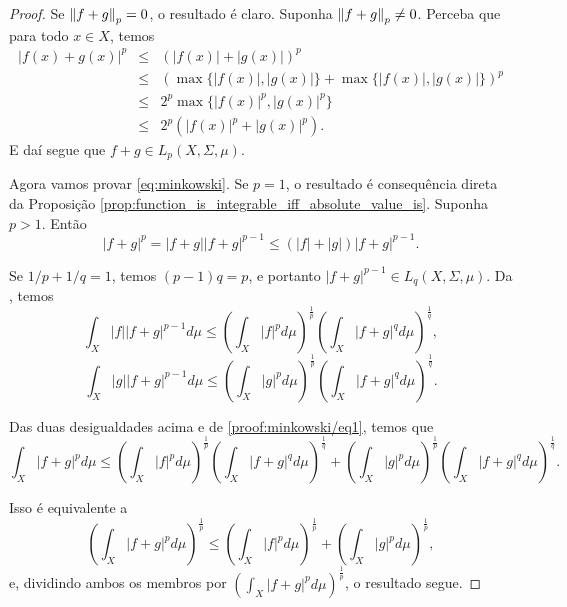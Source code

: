 \begin{proof}
    Se $\left\lVert f + g \right\rVert_p = 0$, o resultado é claro. Suponha $\left\lVert f + g \right\rVert_p \neq 0$. Perceba que para todo $x \in X$, temos
    \begin{eqnarray*}
        |f(x) + g(x)|^p
        &\leq& \left( |f(x)| + |g(x)| \right)^p\\
        &\leq& \left( \max\{|f(x)|, |g(x)|\} + \max\{|f(x)|, |g(x)|\} \right)^p \\
        &\leq& 2^p \max\{ |f(x)|^p, |g(x)|^p \} \\
       &\leq& 2^p \left( |f(x)|^p + |g(x)|^p \right).
    \end{eqnarray*}
    E daí segue que $f + g \in L_p(X, \Sigma, \mu)$.

    Agora vamos provar \eqref{eq:minkowski}. Se $p = 1$, o resultado é consequência direta da Proposição \ref{prop:function_is_integrable_iff_absolute_value_is}. Suponha $p > 1$. Então
    \begin{equation}\label{proof:minkowski/eq1}
        |f + g|^p = |f + g||f + g|^{p-1}
        \leq \left( |f| + |g| \right) |f + g|^{p-1}.
    \end{equation}

    Se $1/p + 1/q = 1$, temos $(p-1)q = p$, e portanto $|f + g|^{p-1} \in L_q(X, \Sigma, \mu)$. Da , temos
    \begin{equation*}
        \int_X |f||f + g|^{p-1} d\mu \leq \left( \int_X |f|^p d\mu \right)^{\frac{1}{p}} \left( \int_X |f + g|^q d\mu \right)^{\frac{1}{q}},
    \end{equation*}
    \begin{equation*}
        \int_X |g||f + g|^{p-1} d\mu \leq \left( \int_X |g|^p d\mu \right)^{\frac{1}{p}} \left( \int_X |f + g|^q d\mu \right)^{\frac{1}{q}}.
    \end{equation*}

    Das duas desigualdades acima e de \ref{proof:minkowski/eq1}, temos que
    \begin{equation*}
        \int_X |f + g|^p d\mu \leq \left( \int_X |f|^p d\mu \right)^{\frac{1}{p}} \left( \int_X |f + g|^q d\mu \right)^{\frac{1}{q}} + \left( \int_X |g|^p d\mu \right)^{\frac{1}{p}} \left( \int_X |f + g|^q d\mu \right)^{\frac{1}{q}}.
    \end{equation*}

    Isso é equivalente a
    \begin{equation*}
        \left( \int_X |f + g|^p d\mu \right)^{\frac{1}{p}} \leq \left( \int_X |f|^p d\mu \right)^{\frac{1}{p}} + \left( \int_X |g|^p d\mu \right)^{\frac{1}{p}},
    \end{equation*}
    e, dividindo ambos os membros por $\left( \int_X |f + g|^p d\mu \right)^{\frac{1}{p}}$, o resultado segue.
\end{proof}

